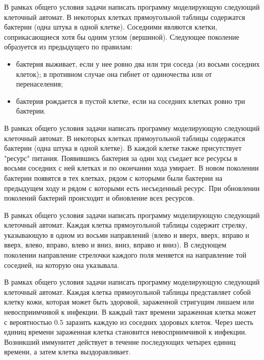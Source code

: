 \begin{zztask}
В рамках общего условия задачи написать программу моделирующую следующий 
клеточный автомат.
В некоторых клетках прямоугольной таблицы содержатся бактерии (одна штука 
в одной клетке). Соседними являются клетки, соприкасающиеся хотя бы одним углом
(вершиной). Следующее поколение образуется из предыдущего по правилам:
\begin{itemize}
	\item бактерия выживает, если у нее ровно два или три соседа (из восьми 
	соседних клеток); в противном случае она гибнет от одиночества или от 
	перенаселения;
	\item бактерия рождается в пустой клетке, если на соседних клетках ровно 
	три бактерии.
\end{itemize}
\end{zztask}

\begin{zztask}[Ресурсы]
В рамках общего условия задачи написать программу моделирующую следующий 
клеточный автомат.
В некоторых клетках прямоугольной таблицы содержатся бактерии (одна штука
в одной клетке). В каждой клетке также присутствует "ресурс" питания. Появившись 
бактерия за один ход съедает все ресурсы в восьми соседних с ней клетках и по 
окончании хода умирает. В новом поколении бактерии появятся в тех клетках, 
рядом с которыми были бактерии на предыдущем ходу и рядом с которыми есть 
несъеденный ресурс. При обновлении поколений бактерий происходит и обновление 
всех ресурсов.
\end{zztask}

\begin{zztask}[Стрелки]
В рамках общего условия задачи написать программу моделирующую следующий 
клеточный автомат.
Каждая клетка прямоугольной таблицы содержит стрелку, указывающую в одном
из восьми направлений (влево и вверх, вверх, вправо и вверх, влево, вправо,
влево и вниз, вниз, вправо и вниз). В следующем поколении направление 
стрелочки каждого поля меняется на направление той соседней, на которую она 
указывала.
\end{zztask}

\begin{zztask}
В рамках общего условия задачи написать программу моделирующую следующий 
клеточный автомат.
Каждая клетка прямоугольной таблицы представляет собой клетку кожи,
которая может быть здоровой, зараженной стригущим лишаем или невосприимчивой
к инфекции. В каждый такт времени зараженная клетка может с вероятностью $0.5$
заразить каждую из соседних здоровых клеток. Через шесть единиц времени
зараженная клетка становится невосприимчивой к инфекции. Возникший иммунитет 
действует в течение последующих четырех единиц времени, а затем клетка 
выздоравливает.
\end{zztask}

